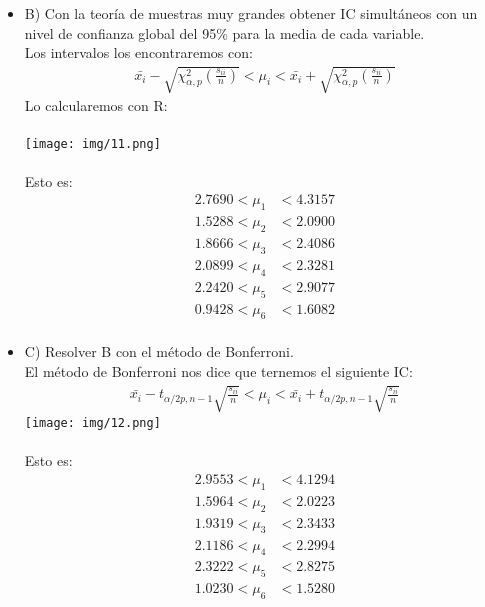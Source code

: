 \begin{sol}
\begin{itemize}
\item B) Con la teoría de muestras muy grandes obtener IC simultáneos con un nivel de confianza global del 95\% para la media de cada variable.\\
Los intervalos los encontraremos con:
\begin{align*}
\bar{x_i}-\sqrt{\chi_{\alpha,p}^2(\frac{s_{ii}}{n})} < \mu_i < \bar{x_i}+\sqrt{\chi_{\alpha,p}^2(\frac{s_{ii}}{n})}
\end{align*}
Lo calcularemos con R:\\\\
\texttt{[image: img/11.png]}\\\\
Esto es: 
\begin{align*}
 2.7690 < \mu_1 &< 4.3157 \\
 1.5288 < \mu_2 &< 2.0900 \\
 1.8666 < \mu_3 &< 2.4086 \\
 2.0899 < \mu_4 &< 2.3281 \\
 2.2420 < \mu_5 &< 2.9077 \\
 0.9428 < \mu_6 &< 1.6082 \\
\end{align*} \pagebreak
\item C) Resolver B con el método de Bonferroni. \\
El método de Bonferroni nos dice que ternemos el siguiente IC:
\begin{align*}
\bar{x_i}-t_{\alpha / 2p,n-1}\sqrt{\frac{s_{ii}}{n}}<\mu_i<\bar{x_i}+t_{\alpha / 2p,n-1}\sqrt{\frac{s_{ii}}{n}}
\end{align*}
\texttt{[image: img/12.png]}\\\\
Esto es:
\begin{align*}
2.9553 < \mu_1 &< 4.1294 \\
1.5964 < \mu_2 &< 2.0223 \\
1.9319 < \mu_3 &< 2.3433 \\
2.1186 < \mu_4 &< 2.2994 \\
2.3222 < \mu_5 &< 2.8275 \\
1.0230 < \mu_6 &< 1.5280 \\
\end{align*}

\end{itemize}
\end{sol}
